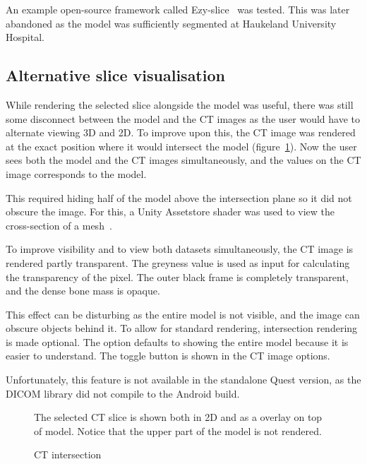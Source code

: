 \documentclass[a4paper]{report}
\begin{document}
An example open-source framework called Ezy-slice~\cite{arayan_davidarayanezy-slice_2022} was tested. This was later abandoned as the model was sufficiently segmented at Haukeland University Hospital.

\subsection{Alternative slice visualisation}
While rendering the selected slice alongside the model was useful, there was still some disconnect between the model and the CT images as the user would have to alternate viewing 3D and 2D.
To improve upon this, the CT image was rendered at the exact position where it would intersect the model (figure~\ref{intersection}). Now the user sees both the model and the CT images simultaneously, and the values on the CT image corresponds to the model.

This required hiding half of the model above the intersection plane so it did not obscure the image. For this, a Unity Assetstore shader was used to view the cross-section of a mesh~\cite{aldandarawy_unity_2019}.

To improve visibility and to view both datasets simultaneously, the CT image is rendered partly transparent. The greyness value is used as input for calculating the transparency of the pixel. The outer black frame is completely transparent, and the dense bone mass is opaque.

This effect can be disturbing as the entire model is not visible, and the image can obscure objects behind it. To allow for standard rendering, intersection rendering is made optional. The option defaults to showing the entire model because it is easier to understand.
The toggle button is shown in the CT image options.


Unfortunately, this feature is not available in the standalone Quest version, as the DICOM library did not compile to the Android build.

\begin{figure}[h!]
    \centering
	\hfill
	\caption{CT intersection}\label{intersection}
  \small
  The selected CT slice is shown both in 2D and as a overlay on top of model. Notice that the upper part of the model is not rendered.
\end{figure}
\end{document}
